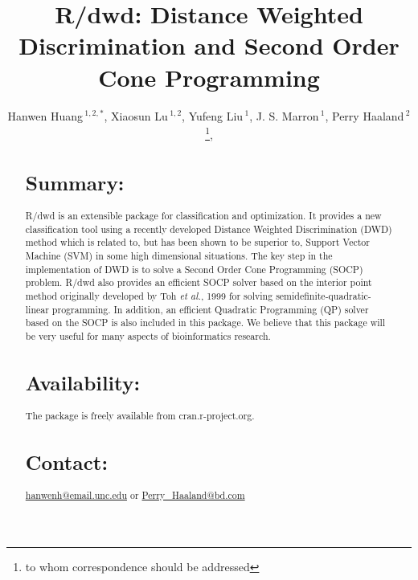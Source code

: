 \documentclass{bioinfo}
\begin{document}

\title[short Title]{R/dwd: Distance Weighted Discrimination and Second Order
Cone Programming}
\author[Sample \textit{et~al}]{Hanwen Huang\,$^{1,2,*}$,
Xiaosun Lu\,$^{1,2}$, Yufeng
Liu\,$^{1}$, J. S. Marron\,$^1$, Perry Haaland\,$^{2}$\footnote{to whom
correspondence should be addressed}, \address{$^{1}$Department of Statistics
and Operations Research, University of North Carolina at Chapel Hill, Chapel
Hill, NC 27599 USA.\\ $^{2}$BD Technologies,
21 Davis Drive, RTP, NC 27709 USA.}}



\maketitle

\begin{abstract}

\section{Summary:}
R/dwd is an extensible package for classification and optimization. It provides
a new classification tool using a recently developed Distance Weighted
Discrimination (DWD) method which is related to, but has been shown to be
superior to, Support Vector Machine (SVM) in some high dimensional situations.
The key step in the implementation of DWD is to solve a Second Order Cone
Programming (SOCP) problem. R/dwd also provides an efficient SOCP solver based
on the interior point method originally developed by Toh {\em et al.}, 1999 for
solving semidefinite-quadratic-linear programming. In addition, an efficient
Quadratic Programming (QP) solver based on the SOCP is also included in this
package. We believe that this package will be very useful for many aspects of
bioinformatics research.

\section{Availability:} The package is freely available from cran.r-project.org.

\section{Contact:} \href{hanwenh@email.unc.edu}{hanwenh@email.unc.edu} or
\href{Perry\_Haaland@bd.com}{Perry\_Haaland@bd.com}
\end{abstract}
\end{document}
